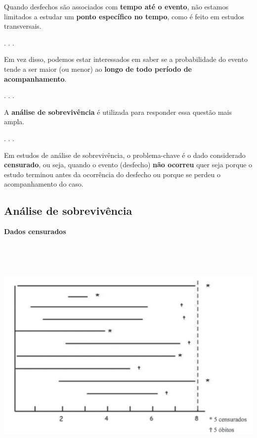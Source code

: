 \documentclass[
  letterpaper,
  DIV=11,
  numbers=noendperiod]{scrartcl}
\begin{document}
Quando desfechos são associados com \textbf{tempo até o evento}, não
estamos limitados a estudar um \textbf{ponto específico no tempo}, como
é feito em estudos transversais.

. . .

Em vez disso, podemos estar interessados em saber se a probabilidade do
evento tende a ser maior (ou menor) ao \textbf{longo de todo período de
acompanhamento}.

. . .

A \textbf{análise de sobrevivência} é utilizada para responder essa
questão mais ampla.

. . .

Em estudos de análise de sobrevivência, o problema-chave é o dado
considerado \textbf{censurado}, ou seja, quando o evento (desfecho)
\textbf{não ocorreu} quer seja porque o estudo terminou antes da
ocorrência do desfecho ou porque se perdeu o acompanhamento do caso.

\subsection{Análise de
sobrevivência}\label{anuxe1lise-de-sobrevivuxeancia-1}

\textbf{Dados censurados}

\begin{center}
\includegraphics[width=6.25in,height=4.6875in]{../../images/censura.png}
\end{center}
\end{document}

